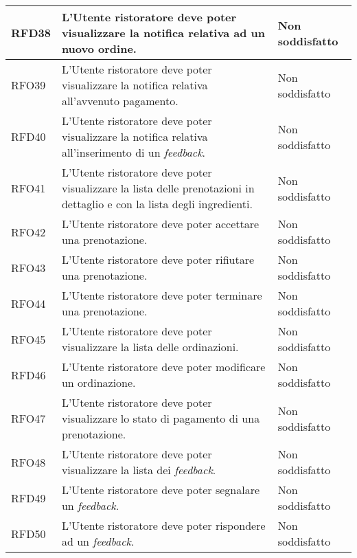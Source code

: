 \begin{longtable}{|l|p{}|p{3cm}|}
	\hline
	RFD38       & L'Utente ristoratore deve poter visualizzare la notifica relativa ad un nuovo ordine.                                & Non soddisfatto \\
	\hline
	RFO39       & L'Utente ristoratore deve poter visualizzare la notifica relativa all'avvenuto pagamento.                            & Non soddisfatto \\
	\hline
	RFD40       & L'Utente ristoratore deve poter visualizzare la notifica relativa all'inserimento di un \textit{feedback}.           & Non soddisfatto \\
	\hline
	RFO41       & L'Utente ristoratore deve poter visualizzare la lista delle prenotazioni in dettaglio e con la lista degli ingredienti. & Non soddisfatto \\
	\hline
	RFO42       & L'Utente ristoratore deve poter accettare una prenotazione.                                                             & Non soddisfatto \\
	\hline
	RFO43       & L'Utente ristoratore deve poter rifiutare una prenotazione.                                                             & Non soddisfatto \\
	\hline
	RFO44       & L'Utente ristoratore deve poter terminare una prenotazione.                                                             & Non soddisfatto \\
	\hline
	RFO45       & L'Utente ristoratore deve poter visualizzare la lista delle ordinazioni.                                                & Non soddisfatto \\
	\hline
	RFD46       & L'Utente ristoratore deve poter modificare un ordinazione.                                                              & Non soddisfatto \\
	\hline
	RFO47       & L'Utente ristoratore deve poter visualizzare lo stato di pagamento di una prenotazione.                                 & Non soddisfatto \\
	\hline
	RFO48       & L'Utente ristoratore deve poter visualizzare la lista dei \textit{feedback}.                                            & Non soddisfatto \\
	\hline
	RFD49       & L'Utente ristoratore deve poter segnalare un \textit{feedback}.                                                         & Non soddisfatto \\
	\hline
	RFD50       & L'Utente ristoratore deve poter rispondere ad un \textit{feedback}.                                                     & Non soddisfatto \\

\end{longtable}
